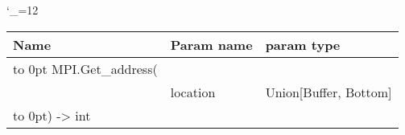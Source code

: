 \begingroup \catcode`\_=12 \tt
\begin{tabular}{lll}
\toprule
\textrm{Name}&\textrm{Param name}&\textrm{param type}\\
\midrule
\hbox to 0pt {MPI.Get_address(\hss}\\
& location & Union[Buffer, Bottom]\\
\hbox to 0pt{) -> int\hss}\\
\bottomrule
\end{tabular}
\endgroup
